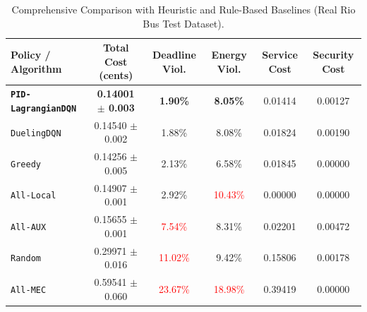 \documentclass[12pt,a4paper]{article}
\begin{document}
\begin{table}[htbp]
\centering
\small
\caption{Comprehensive Comparison with Heuristic and Rule-Based Baselines (Real Rio Bus Test Dataset).}
\label{tab:heuristic_comparison}
\begin{tabular}{lccccc}
\toprule
\textbf{Policy / Algorithm} & \textbf{Total Cost (cents)} & \textbf{Deadline Viol.} & \textbf{Energy Viol.} & \textbf{Service Cost} & \textbf{Security Cost} \\
\midrule
\textbf{\texttt{PID-LagrangianDQN}} & \textbf{0.14001 $\pm$ 0.003} & \textbf{1.90\%} & \textbf{8.05\%} & 0.01414 & 0.00127 \\
\texttt{DuelingDQN} & 0.14540 $\pm$ 0.002 & 1.88\% & 8.08\% & 0.01824 & 0.00190 \\
\texttt{Greedy} & 0.14256 $\pm$ 0.005 & 2.13\% & 6.58\% & 0.01845 & 0.00000 \\
\texttt{All-Local} & 0.14907 $\pm$ 0.001 & 2.92\% & \textcolor{red}{10.43\%} & 0.00000 & 0.00000 \\
\texttt{All-AUX} & 0.15655 $\pm$ 0.001 & \textcolor{red}{7.54\%} & 8.31\% & 0.02201 & 0.00472 \\
\texttt{Random} & 0.29971 $\pm$ 0.016 & \textcolor{red}{11.02\%} & 9.42\% & 0.15806 & 0.00178 \\
\texttt{All-MEC} & 0.59541 $\pm$ 0.060 & \textcolor{red}{23.67\%} & \textcolor{red}{18.98\%} & 0.39419 & 0.00000 \\
\bottomrule
\end{tabular}
\end{table}
\end{document}

